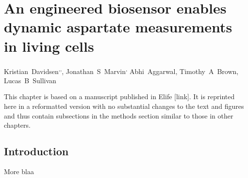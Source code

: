 \chapter{An engineered biosensor enables dynamic aspartate measurements in living cells}
\label{chap3}

\renewcommand{\thefootnote}{\fnsymbol{footnote}}
\begin{center}
    \mbox{Kristian Davidsen\footnotemark[1]\textsuperscript{,}\footnotemark[2]\textsuperscript{,}\footnotemark[4],}
    \mbox{Jonathan S Marvin\footnotemark[3]\textsuperscript{,}\footnotemark[4]\footnotemark[5]}
    \mbox{Abhi Aggarwal\footnotemark[3],}
    \mbox{Timothy A Brown\footnotemark[3],}
    \mbox{Lucas B Sullivan\footnotemark[1]\footnotemark[5]}
\end{center}

\setcounter{footnote}{0}
\renewcommand{\thefootnote}{\arabic{footnote}}




This chapter is based on a manuscript published in Elife [link].
It is reprinted here in a reformatted version with no substantial changes to the text and figures and thus contain subsections in the methods section similar to those in other chapters.







\section{Introduction}
More blaa